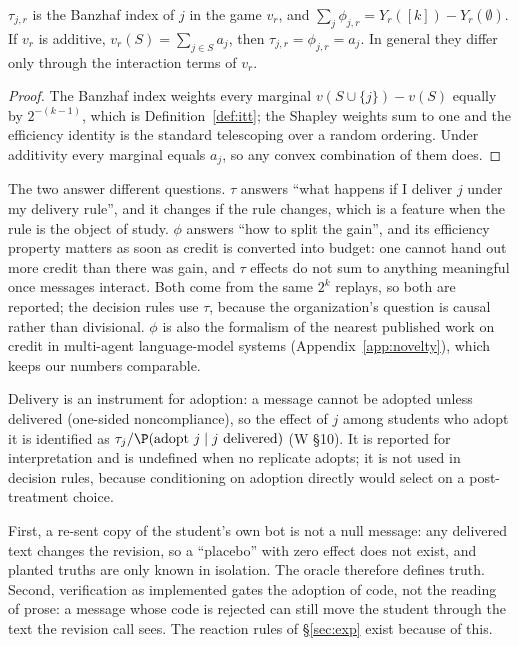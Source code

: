 \documentclass[11pt]{article}
\numberwithin{theorem}{section}
\theoremstyle{definition}
\theoremstyle{problemstyle}
\begin{document}
\begin{prop}\label{prop:banzhaf}
$\tau_{j,r}$ is the Banzhaf index of $j$ in the game $v_r$, and $\sum_j\phi_{j,r} = Y_r([k]) - Y_r(\emptyset)$. If
$v_r$ is additive, $v_r(S)=\sum_{j\in S}a_j$, then $\tau_{j,r}=\phi_{j,r}=a_j$. In general they differ only through
the interaction terms of $v_r$.
\end{prop}
\begin{proof}
The Banzhaf index weights every marginal $v(S\cup\{j\})-v(S)$ equally by $2^{-(k-1)}$, which is
Definition~\ref{def:itt}; the Shapley weights sum to one and the efficiency identity is the standard telescoping over
a random ordering. Under additivity every marginal equals $a_j$, so any convex combination of them does.
\end{proof}

\begin{remark}
The two answer different questions. $\tau$ answers ``what happens if I deliver $j$ under my delivery rule'', and it
changes if the rule changes, which is a feature when the rule is the object of study. $\phi$ answers ``how to split the
gain'', and its efficiency property matters as soon as credit is converted into budget: one cannot hand out more
credit than there was gain, and $\tau$ effects do not sum to anything meaningful once messages interact. Both come
from the same $2^k$ replays, so both are reported; the decision rules use $\tau$, because the organization's question
is causal rather than divisional. $\phi$ is also the formalism of the nearest published work on credit in multi-agent
language-model systems (Appendix~\ref{app:novelty}), which keeps our numbers comparable.
\end{remark}

\begin{definition}
Delivery is an instrument for adoption: a message cannot be adopted unless delivered (one-sided noncompliance), so the
effect of $j$ among students who adopt it is identified as $\tau_{j}/\P(\text{adopt } j\mid j \text{ delivered})$
(W \S10). It is reported for interpretation and is undefined when no replicate adopts; it is not used in decision
rules, because conditioning on adoption directly would select on a post-treatment choice.
\end{definition}

\begin{remark}
First, a re-sent copy of the student's own bot is not a null message: any delivered text changes the revision, so a
``placebo'' with zero effect does not exist, and planted truths are only known in isolation. The oracle therefore
defines truth. Second, verification as implemented gates the adoption of code, not the reading of prose: a message
whose code is rejected can still move the student through the text the revision call sees. The reaction rules of
\S\ref{sec:exp} exist because of this.
\end{remark}
\end{document}

